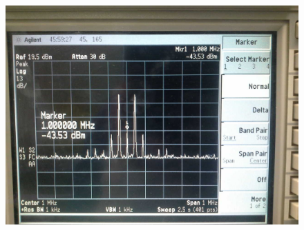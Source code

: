 
\FloatBarrier\begin{figure}[!h]
\centering
\includegraphics[scale=0.25]{../Grafiken/Frequenzspektrum_b_AmpModuliertTraegerunterdrueckung_0.jpg}
\caption{\label{fig:frequenzspektrum_b_ampmodulierttraegerunterdrueckung_0}}
\end{figure}
\FloatBarrier
